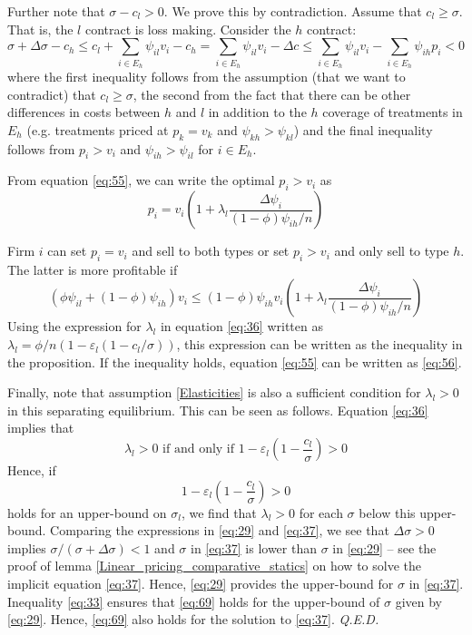 \documentclass[a4paper,12pt]{article}
\newcommand{\qed}{\hspace*{\fill} {\em Q.E.D.}}
\begin{document}
Further note that \(\sigma-c_l >0\). We prove this by contradiction. Assume that \(c_l \geq \sigma\). That is, the \(l\) contract is loss making. Consider the \(h\) contract:
\begin{equation}
\label{eq:46}
\sigma+\Delta \sigma - c_h \leq c_l + \sum_{i \in E_h} \psi_{il} v_i - c_h =  \sum_{i \in E_h} \psi_{il} v_i - \Delta c \leq \sum_{i \in E_h} \psi_{il} v_i - \sum_{i \in E_h} \psi_{ih} p_i < 0
\end{equation}
where the first inequality follows from the assumption (that we want to contradict) that \(c_l \geq \sigma\), the second from the fact that there can be other differences in costs between \(h\) and \(l\) in addition to the \(h\) coverage of treatments in \(E_h\) (e.g. treatments priced at \(p_k=v_k\) and \(\psi_{kh}>\psi_{kl}\)) and the final inequality follows from \(p_i>v_i\) and \(\psi_{ih} > \psi_{il}\) for \(i \in E_h\).

From equation \eqref{eq:55}, we can write the optimal \(p_i>v_i\) as
\begin{equation}
\label{eq:60}
p_i = v_i \left( 1+ \lambda_l \frac{\Delta\psi_i}{(1-\phi)\psi_{ih}/n} \right)
\end{equation}

Firm \(i\) can set \(p_i = v_i\) and sell to both types or set \(p_i>v_i\) and only sell to type \(h\). The latter is more profitable if
\begin{equation}
\label{eq:3}
(\phi \psi_{il} + (1-\phi)\psi_{ih})v_i \leq (1-\phi)\psi_{ih} v_i \left( 1+\lambda_l \frac{\Delta \psi_i}{(1-\phi)\psi_{ih}/n} \right)
\end{equation}
Using the expression for \(\lambda_l\) in equation \eqref{eq:36} written as \(\lambda_l = \phi/n (1 - \varepsilon_l (1-c_{l}/\sigma))\), this expression can be written as the inequality in the proposition. If the inequality holds, equation \eqref{eq:55} can be written as \eqref{eq:56}.

Finally, note that assumption \ref{Elasticities} is also a sufficient condition for \(\lambda_l > 0\) in this separating equilibrium. This can be seen as follows. Equation \eqref{eq:36} implies that
\begin{equation}
\label{eq:68}
\lambda_l > 0 \text{ if and only if } 1-\varepsilon_l \left(1-\frac{c_l}{\sigma} \right) > 0
\end{equation}
Hence, if
\begin{equation}
\label{eq:69}
1-\varepsilon_l \left(1-\frac{c_l}{\sigma} \right) > 0
\end{equation}
holds for an upper-bound on \(\sigma_l\), we find that \(\lambda_l > 0\) for each \(\sigma\) below this upper-bound. Comparing the expressions in \eqref{eq:29} and \eqref{eq:37}, we see that \(\Delta \sigma > 0\) implies \(\sigma/(\sigma+\Delta\sigma)<1\) and \(\sigma\) in \eqref{eq:37} is lower than \(\sigma\) in \eqref{eq:29} -- see the proof of lemma \ref{Linear_pricing_comparative_statics} on how to solve the implicit equation \eqref{eq:37}. Hence, \eqref{eq:29} provides the upper-bound for \(\sigma\) in \eqref{eq:37}. Inequality \eqref{eq:33} ensures that \eqref{eq:69} holds for the upper-bound of \(\sigma\) given by \eqref{eq:29}. Hence, \eqref{eq:69} also holds for the solution to \eqref{eq:37}. 
 \qed
\end{document}
